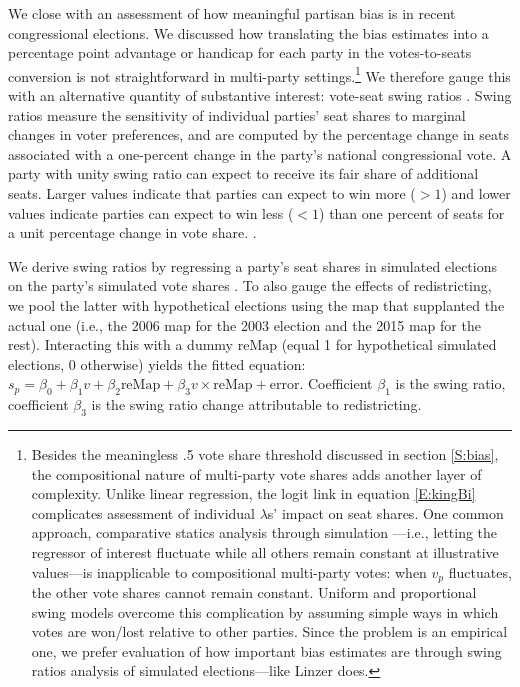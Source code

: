 \documentclass[letter,12pt]{article}
\begin{document}
{We close with an assessment of how meaningful partisan bias is in recent congressional elections. We discussed how translating the bias estimates into a percentage point advantage or handicap for each party in the votes-to-seats conversion is not straightforward in multi-party settings.\footnote{Besides the meaningless .5 vote share threshold discussed in section \ref{S:bias}, the compositional nature of multi-party vote shares adds another layer of complexity. Unlike linear regression, the logit link in equation \ref{E:kingBi} complicates assessment of individual $\lambda$s' impact on seat shares. One common approach, comparative statics analysis through simulation \citep[e.g.,][]{tomz.etal.2001}---i.e., letting the regressor of interest fluctuate while all others remain constant at illustrative values---is inapplicable to compositional multi-party votes: when $v_p$ fluctuates, the other vote shares cannot remain constant. Uniform and proportional swing models overcome this complication by assuming simple ways in which votes are won/lost relative to other parties. Since the problem is an empirical one, we prefer evaluation of how important bias estimates are through swing ratios analysis of simulated elections---like Linzer does.} We therefore gauge this with an alternative quantity of substantive interest: vote-seat swing ratios \citep{tufte1973seatsVotes,niemi.fett1986swing}. Swing ratios measure the sensitivity of individual parties' seat shares to marginal changes in voter preferences, and are computed by the percentage change in seats associated with a one-percent change in the party's national congressional vote. A party with unity swing ratio can expect to receive its fair share of additional seats. Larger values indicate that parties can expect to win more ($>1$) and lower values indicate parties can expect to win less ($<1$) than one percent of seats for a unit percentage change in vote share. \citep[We rule out negative swing ratios corresponding to a party losing seats as it wins votes; for violations of the monotonicity principle of representation, see][]{balinskiYoung2001FairRep}. 

We derive swing ratios by regressing a party's seat shares in simulated elections on the party's simulated vote shares \citep[][:408]{linzerSeatVoteElasticity2012}. To also gauge the effects of redistricting, we pool the latter with hypothetical elections using the map that supplanted the actual one (i.e., the 2006 map for the 2003 election and the 2015 map for the rest). Interacting this with a dummy $\text{reMap}$ (equal 1 for hypothetical simulated elections, 0 otherwise) yields the fitted equation: $s_p = \beta_0 + \beta_1 v + \beta_2 \text{reMap} + \beta_3 v \times \text{reMap} + \text{error}$. Coefficient $\beta_1$ is the swing ratio, coefficient $\beta_3$ is the swing ratio change attributable to redistricting. 

}
\end{document}
